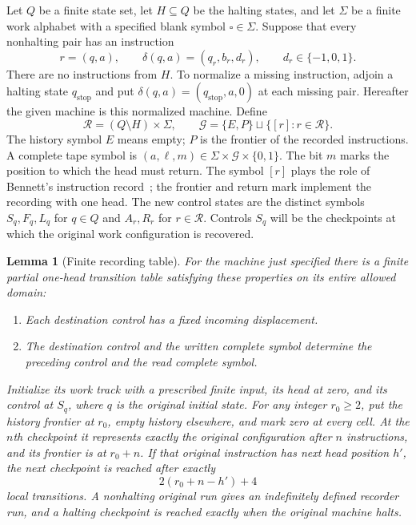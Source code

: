 \documentclass[11pt]{article}
\newtheorem{lemma}[theorem]{Lemma}
\theoremstyle{remark}
\begin{document}
Let $Q$ be a finite state set, let $H\subseteq Q$ be the halting states, and let
$\Sigma$ be a finite work alphabet with a specified blank symbol
$\square\in\Sigma$. Suppose that every
nonhalting pair has an instruction
\[
 r=(q,a),\qquad \delta(q,a)=(q_r,b_r,d_r),\qquad d_r\in\{-1,0,1\}.
\]
There are no instructions from $H$. To normalize a missing instruction,
adjoin a halting state $q_{\mathrm{stop}}$ and put
$\delta(q,a)=(q_{\mathrm{stop}},a,0)$ at each missing pair.
Hereafter the given machine is this normalized machine. Define
\[
 \mathcal R=(Q\setminus H)\times\Sigma,
 \qquad \mathcal G=\{E,P\}\sqcup\{[r]:r\in\mathcal R\}.
\]
The history symbol $E$ means empty; $P$ is the frontier of the recorded
instructions. A complete tape symbol is
$(a,\ell,m)\in\Sigma\times\mathcal G\times\{0,1\}$. The bit $m$ marks the
position to which the head must return. The symbol $[r]$ plays the role
of Bennett's instruction record~\cite[Eqs.~(9)--(11)]{Bennett}; the
frontier and return mark implement the recording with one head.
The new control states are the
distinct symbols $S_q,F_q,L_q$ for $q\in Q$ and $A_r,R_r$ for
$r\in\mathcal R$. Controls $S_q$ will be the checkpoints at which the
original work configuration is recovered.

\begin{lemma}[Finite recording table]\label{lem:recorder}
For the machine just specified there is a finite partial one-head transition
table satisfying these properties on its entire allowed domain:
\begin{enumerate}[label=(\roman*),nosep]
\item Each destination control has a fixed incoming displacement.
\item The destination control and the written complete symbol determine the
preceding control and the read complete symbol.
\end{enumerate}
Initialize its work track with a prescribed finite input, its head at zero,
and its control at $S_q$, where $q$ is the original initial state. For any
integer $r_0\ge2$, put the history frontier at $r_0$, empty history elsewhere,
and mark zero at every cell. At the $n$th checkpoint it represents exactly the
original configuration after $n$ instructions, and its frontier is at
$r_0+n$. If that original instruction has next head position $h'$, the next
checkpoint is reached after exactly
\begin{equation}\label{eq:count}
 2(r_0+n-h')+4
\end{equation}
local transitions. A nonhalting original run gives an indefinitely defined
recorder run, and a halting checkpoint is reached exactly when the original
machine halts.
\end{lemma}
\end{document}

